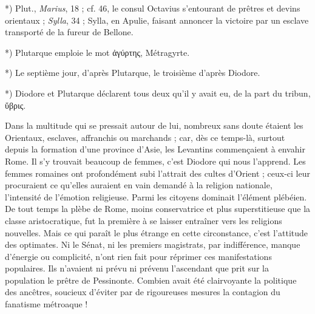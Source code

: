 \documentclass[a4paper, 11pt, oneside, polutonikogreek, french]{article}
\begin{document}
*) Plut., \emph{Marius}, 18 ; cf. 46, le consul Octavius s'entourant de prêtres et devins orientaux ; \emph{Sylla}, 34 ; Sylla, en Apulie, faisant annoncer la victoire par un esclave transporté de la fureur de Bellone.

*) Plutarque emploie le mot ἀγύρτης, Métragyrte.

*) Le septième jour, d'après Plutarque, le troisième d'après Diodore.

*) Diodore et Plutarque déclarent tous deux qu'il y avait eu, de la part du tribun, ὕβρις.

Dans la multitude qui se pressait autour de lui, nombreux sans doute étaient les Orientaux, esclaves, affranchis ou marchands ; car, dès ce temps-là, surtout depuis la formation d'une province d'Asie, les Levantins commençaient à envahir Rome. Il s'y trouvait beaucoup de femmes, c'est Diodore qui nous l'apprend. Les femmes romaines ont profondément subi l'attrait des cultes d'Orient ; ceux-ci leur procuraient ce qu'elles auraient en vain demandé à la religion nationale, l'intensité de l'émotion religieuse. Parmi les citoyens dominait l'élément plébéien. De tout temps la plèbe de Rome, moins conservatrice et plus superstitieuse que la classe aristocratique, fut la première à se laisser entraîner vers les religions nouvelles. Mais ce qui paraît le plus étrange en cette circonstance, c'est l'attitude des optimates. Ni le Sénat, ni les premiers magistrats, par indifférence, manque d'énergie ou complicité, n'ont rien fait pour réprimer ces manifestations populaires. Ils n'avaient ni prévu ni prévenu l'ascendant que prit sur la population le prêtre de Pessinonte. Combien avait été clairvoyante la politique des ancêtres, soucieux d'éviter par de rigoureuses mesures la contagion du fanatisme métroaque !
\end{document}
